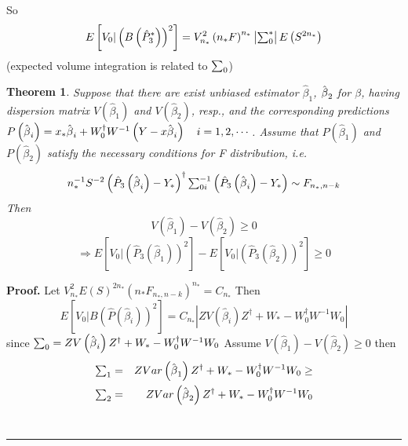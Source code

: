 \documentclass{article}
\newtheorem{theorem}{Theorem}
\newenvironment{proof}[1][Proof]{\noindent\textbf{#1.} }{\ \rule{0.5em}{0.5em}}
\begin{document}
So%
\begin{equation*}
E\left[ V_{0}|\left( B\left( \hat{P}_{3}^{\ast }\right) \right) ^{2}\right]
=V_{n_{\ast }}^{2}\left( n_{\ast }F\right) ^{n_{\ast }}\left\vert
\mathop{\textstyle \sum }\nolimits_{0}^{\ast }\right\vert E\left( S^{2n_{\ast }}\right)
\end{equation*}%
(expected volume integration is related to $\mathop{\textstyle \sum }\nolimits_{0}$)

\bigskip

\begin{theorem}
Suppose that there are exist unbiased estimator $\hat{\beta}_{1}$, $\hat{%
\beta}_{2}$ for $\beta $, having dispersion matrix $V\left( \hat{\beta}%
_{1}\right) $ and $V\left( \hat{\beta}_{2}\right) $, resp., and the
corresponding predictions $P\left( \hat{\beta}_{i}\right) =x_{\ast }\hat{%
\beta}_{i}+W_{0}^{\dagger }W^{-1}\left( Y-x\hat{\beta}_{i}\right) \quad
i=1,2,\cdots $.\newline
Assume that $P\left( \hat{\beta}_{1}\right) $ and $P\left( \hat{\beta}%
_{2}\right) $ satisfy the necessary conditions for F distribution, i.e. 
\begin{equation*}
n_{\ast }^{-1}S^{-2}\left( \hat{P}_{3}\left( \hat{\beta}_{i}\right) -Y_{\ast
}\right) ^{\dagger }\tsum\nolimits_{0i}^{-1}\left( \hat{P}_{3}\left( \hat{%
\beta}_{i}\right) -Y_{\ast }\right) \sim F_{n_{\ast },n-k}
\end{equation*}%
Then%
\begin{equation*}
V\left( \hat{\beta}_{1}\right) -V\left( \hat{\beta}_{2}\right) \geq 0
\end{equation*}%
\begin{equation*}
\Rightarrow E\left[ V_{0}|\left( \hat{P}_{3}\left( \hat{\beta}_{1}\right)
\right) ^{2}\right] -E\left[ V_{0}|\left( \hat{P}_{3}\left( \hat{\beta}%
_{2}\right) \right) ^{2}\right] \geq 0
\end{equation*}
\end{theorem}

\bigskip 

\begin{proof}
Let $V_{n_{\ast }}^{2}E\left( S\right) ^{2n_{\ast }}\left( n_{\ast
}F_{n_{\ast },n-k}\right) ^{n_{\ast }}=C_{n_{\ast }}$\newline
Then%
\begin{equation*}
E\left[ V_{0}|B\left( \hat{P}\left( \hat{\beta}_{i}\right) \right) ^{2}%
\right] =C_{n_{\ast }}\left\vert ZV\left( \hat{\beta}_{i}\right) Z^{\dagger
}+W_{\ast }-W_{0}^{\dagger }W^{-1}W_{0}\right\vert 
\end{equation*}%
since $\tsum\nolimits_{0}=ZV\left( \hat{\beta}_{i}\right) Z^{\dagger
}+W_{\ast }-W_{0}^{\dagger }W^{-1}W_{0}$\newline
Assume $V\left( \hat{\beta}_{1}\right) -V\left( \hat{\beta}_{2}\right) \geq 0
$\newline
then 
\begin{eqnarray*}
\tsum\nolimits_{1} &=&ZVar\left( \hat{\beta}_{1}\right) Z^{\dagger }+W_{\ast
}-W_{0}^{\dagger }W^{-1}W_{0}\geq  \\
\tsum\nolimits_{2} &=&ZVar\left( \hat{\beta}_{2}\right) Z^{\dagger }+W_{\ast
}-W_{0}^{\dagger }W^{-1}W_{0}
\end{eqnarray*}
\end{proof}
\end{document}
